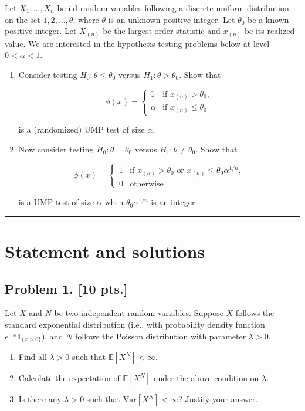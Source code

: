 \documentclass[11pt,a4paper]{article}
\newcommand{\examstatement}[1]{%
  \par\addvspace{0.85em}%
  \noindent{\bfseries #1}\par\nobreak\addvspace{0.28em}%
}
\begin{document}
\examstatement{Problem 11. [10 pts.]}
Let \( X_1, \dots, X_n \) be iid random variables following a discrete uniform distribution on the set \( 1, 2, \dots, \theta \), where \( \theta \) is an unknown positive integer. Let \( \theta_0 \) be a known positive integer. Let \( X_{(n)} \) be the largest order statistic and \( x_{(n)} \) be its realized value. We are interested in the hypothesis testing problems below at level \( 0 < \alpha < 1 \).
\begin{enumerate}[label=(\alph*)]
    \item Consider testing \( H_0 : \theta \le \theta_0 \) versus \( H_1 : \theta > \theta_0 \). Show that

    \[
    \phi(x) =
    \begin{cases}
    1 & \text{if } x_{(n)} > \theta_0, \\
    \alpha & \text{if } x_{(n)} \le \theta_0
    \end{cases}
    \]

    is a (randomized) UMP test of size \( \alpha \).
    \item Now consider testing \( H_0 : \theta = \theta_0 \) versus \( H_1 : \theta \neq \theta_0 \). Show that

    \[
    \phi(x) =
    \begin{cases}
    1 & \text{if } x_{(n)} > \theta_0 \text{ or } x_{(n)} \le \theta_0 \alpha^{1/n}, \\
    0 & \text{otherwise}
    \end{cases}
    \]

    is a UMP test of size \( \alpha \) when \( \theta_0 \alpha^{1/n} \) is an integer.
\end{enumerate}

\noindent\rule{\linewidth}{0.4pt}

\section{Statement and solutions}

\subsection{Problem 1. [10 pts.]}
Let \( X \) and \( N \) be two independent random variables. Suppose \( X \) follows the standard exponential distribution (i.e., with probability density function \( e^{-x} \mathbf{1}_{\{x>0\}} \)), and \( N \) follows the Poisson distribution with parameter \( \lambda > 0 \).
\begin{enumerate}[label=(\alph*)]
    \item Find all \( \lambda > 0 \) such that \( \mathbb{E}[X^N] < \infty \).
    \item Calculate the expectation of \( \mathbb{E}[X^N] \) under the above condition on \( \lambda \).
    \item Is there any \( \lambda > 0 \) such that \( \mathrm{Var}[X^N] < \infty \)? Justify your answer.
\end{enumerate}
\end{document}
